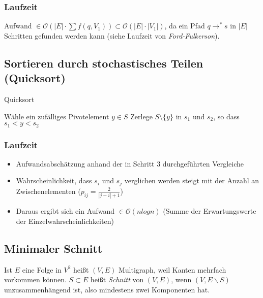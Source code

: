 \subsubsection{Laufzeit}
Aufwand \(\in \mathcal{O}(|E|\cdot \sum f(q, V_1)) \subset \mathcal{O}(|E| \cdot |V_1|)\), da ein Pfad \(q \rightarrow^* s\) in \(|E|\) Schritten gefunden werden kann (siehe Laufzeit von \textit{Ford-Fulkerson}).


\subsection{Sortieren durch stochastisches Teilen (Quicksort)}
\begin{algorithm}[H]
	\caption{Quicksort}

	\BlankLine
	
	 {
		Wähle ein zufälliges Pivotelement $ y \in S $ \newline
		Zerlege $S \setminus \{ y \} $ 	in 	$  s_1 $ und $ s_2 $, so dass 	$ s_1 < y < s_2 $
		\BlankLine
	}
\end{algorithm}

\subsubsection{Laufzeit}
\begin{itemize}
	\item Aufwandsabschätzung anhand der in Schritt 3 durchgeführten Vergleiche
	\item Wahrscheinlichkeit, dass \(s_i\) und \(s_j\) verglichen werden steigt mit der Anzahl an Zwischenelementen (\(p_{ij}=\frac{2}{|j-i|+1}\))
	\item Daraus ergibt sich ein Aufwand \(\in \mathcal{O}(nlogn)\) (Summe der Erwartungswerte der Einzelwahrscheinlichkeiten)
\end{itemize}


\subsection{Minimaler Schnitt}
Ist \(E\) eine Folge in \(V^2\) heißt \((V,E)\) Multigraph, weil Kanten mehrfach vorkommen können. \(S \subset E\) heißt \textit{Schnitt} von \((V,E)\), wenn \((V, E \backslash S)\) unzusammenhängend ist, also mindestens zwei Komponenten hat.

